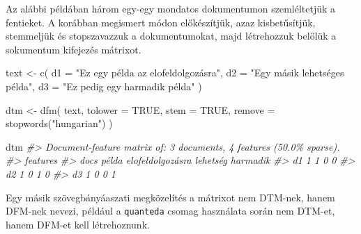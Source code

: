 \documentclass[
]{book}
\newenvironment{Shaded}{\begin{snugshade}}{\end{snugshade}}
\newcommand{\AttributeTok}[1]{\textcolor[rgb]{0.77,0.63,0.00}{#1}}
\newcommand{\CommentTok}[1]{\textcolor[rgb]{0.56,0.35,0.01}{\textit{#1}}}
\newcommand{\ConstantTok}[1]{\textcolor[rgb]{0.00,0.00,0.00}{#1}}
\newcommand{\FunctionTok}[1]{\textcolor[rgb]{0.00,0.00,0.00}{#1}}
\newcommand{\NormalTok}[1]{#1}
\newcommand{\OtherTok}[1]{\textcolor[rgb]{0.56,0.35,0.01}{#1}}
\newcommand{\StringTok}[1]{\textcolor[rgb]{0.31,0.60,0.02}{#1}}
\begin{document}
Az alábbi példában három egy-egy mondatos dokumentumon szemléltetjük a
fentieket. A korábban megismert módon előkészítjük, azaz kisbetűsítjük,
stemmeljük és stopszavazzuk a dokumentumokat, majd létrehozzuk belőlük a
sokumentum kifejezés mátrixot.

\begin{Shaded}
\begin{Highlighting}[]

\NormalTok{text }\OtherTok{\textless{}{-}} \FunctionTok{c}\NormalTok{(}
  \AttributeTok{d1 =} \StringTok{"Ez egy példa az elofeldolgozásra"}\NormalTok{,}
  \AttributeTok{d2 =} \StringTok{"Egy másik lehetséges példa"}\NormalTok{,}
  \AttributeTok{d3 =} \StringTok{"Ez pedig egy harmadik példa"}
\NormalTok{)}

\NormalTok{dtm }\OtherTok{\textless{}{-}} \FunctionTok{dfm}\NormalTok{(}
\NormalTok{  text,}
  \AttributeTok{tolower =} \ConstantTok{TRUE}\NormalTok{, }\AttributeTok{stem =} \ConstantTok{TRUE}\NormalTok{,}
  \AttributeTok{remove =} \FunctionTok{stopwords}\NormalTok{(}\StringTok{"hungarian"}\NormalTok{)}
\NormalTok{)}

\NormalTok{dtm}
\CommentTok{\#\textgreater{} Document{-}feature matrix of: 3 documents, 4 features (50.0\% sparse).}
\CommentTok{\#\textgreater{}     features}
\CommentTok{\#\textgreater{} docs példa elofeldolgozásra lehetség harmadik}
\CommentTok{\#\textgreater{}   d1     1                1        0        0}
\CommentTok{\#\textgreater{}   d2     1                0        1        0}
\CommentTok{\#\textgreater{}   d3     1                0        0        1}
\end{Highlighting}
\end{Shaded}

Egy másik szövegbányáaszati megközelítés a mátrixot nem DTM-nek, hanem
DFM-nek nevezi, például a \texttt{quanteda} csomag használata során nem
DTM-et, hanem DFM-et kell létrehoznunk.
\end{document}
